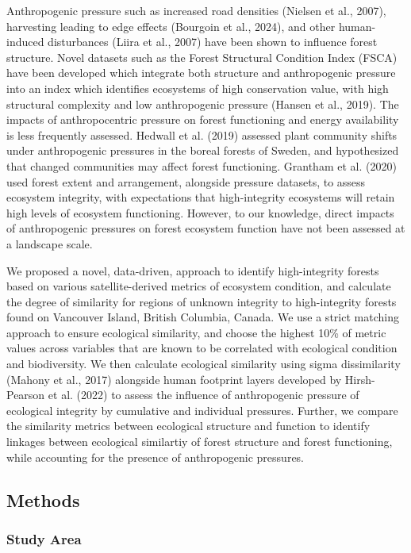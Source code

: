 \documentclass[
]{agujournal2019}
\begin{document}
Anthropogenic pressure such as increased road densities (Nielsen et al.,
2007), harvesting leading to edge effects (Bourgoin et al., 2024), and
other human-induced disturbances (Liira et al., 2007) have been shown to
influence forest structure. Novel datasets such as the Forest Structural
Condition Index (FSCA) have been developed which integrate both
structure and anthropogenic pressure into an index which identifies
ecosystems of high conservation value, with high structural complexity
and low anthropogenic pressure (Hansen et al., 2019). The impacts of
anthropocentric pressure on forest functioning and energy availability
is less frequently assessed. Hedwall et al. (2019) assessed plant
community shifts under anthropogenic pressures in the boreal forests of
Sweden, and hypothesized that changed communities may affect forest
functioning. Grantham et al. (2020) used forest extent and arrangement,
alongside pressure datasets, to assess ecosystem integrity, with
expectations that high-integrity ecosystems will retain high levels of
ecosystem functioning. However, to our knowledge, direct impacts of
anthropogenic pressures on forest ecosystem function have not been
assessed at a landscape scale.

We proposed a novel, data-driven, approach to identify high-integrity
forests based on various satellite-derived metrics of ecosystem
condition, and calculate the degree of similarity for regions of unknown
integrity to high-integrity forests found on Vancouver Island, British
Columbia, Canada. We use a strict matching approach to ensure ecological
similarity, and choose the highest 10\% of metric values across
variables that are known to be correlated with ecological condition and
biodiversity. We then calculate ecological similarity using sigma
dissimilarity (Mahony et al., 2017) alongside human footprint layers
developed by Hirsh-Pearson et al. (2022) to assess the influence of
anthropogenic pressure of ecological integrity by cumulative and
individual pressures. Further, we compare the similarity metrics between
ecological structure and function to identify linkages between
ecological similartiy of forest structure and forest functioning, while
accounting for the presence of anthropogenic pressures.

\subsection{Methods}\label{methods}

\subsubsection{Study Area}\label{study-area}
\end{document}
